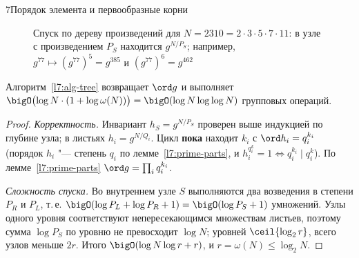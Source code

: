\begin{lecture}{7}{Порядок элемента и первообразные корни}
\begin{figure}[ht]
\centering
{}
\caption{Спуск по дереву произведений для $N = 2310 = 2 \cdot 3 \cdot 5 \cdot 7 \cdot 11$:
в узле с произведением $P_S$ находится $g^{N/P_S}$; например, $g^{77} \mapsto (g^{77})^{5} =
g^{385}$ и $(g^{77})^{6} = g^{462}$}
\label{l7:fig-tree}
\end{figure}

\begin{theorem}\label{l7:tree-correct}
Алгоритм~\ref{l7:alg-tree} возвращает $\ord g$ и выполняет
$\bigO\bigl(\log N \cdot (1 + \log \omega(N))\bigr) = \bigO(\log N \log\log N)$ групповых
операций.
\end{theorem}

\begin{proof}
\emph{Корректность.} Инвариант $h_S = g^{N/P_S}$ проверен выше индукцией по глубине узла;
в листьях $h_i = g^{N/Q_i}$. Цикл \textbf{пока} находит $k_i$ с $\ord h_i = q_i^{k_i}$
(порядок $h_i$ "--- степень $q_i$ по лемме~\ref{l7:prime-parts}, и $h_i^{q_i^k} = 1 \iff
q_i^{k_i} \mid q_i^k$). По лемме~\ref{l7:prime-parts} $\ord g = \prod_i q_i^{k_i}$.

\emph{Сложность спуска.} Во внутреннем узле $S$ выполняются два возведения в степени $P_R$ и
$P_L$, т.\,е. $\bigO(\log P_L + \log P_R + 1) = \bigO(\log P_S + 1)$ умножений. Узлы одного
уровня соответствуют непересекающимся множествам листьев, поэтому сумма $\log P_S$ по уровню не
превосходит $\log N$; уровней $\ceil{\log_2 r}$, всего узлов меньше $2r$. Итого
$\bigO(\log N \log r + r)$, и $r = \omega(N) \le \log_2 N$.


\end{proof}
\end{lecture}
